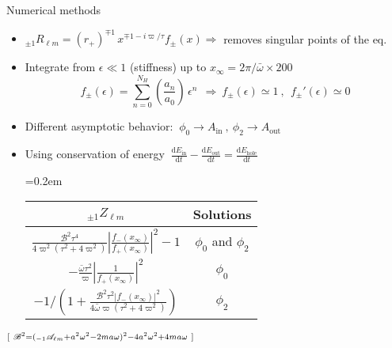 \documentclass[9pt]{beamer}
\newcommand{\dd}{\mathrm{d}}
\newcommand{\uu}[3][]{ {}_{#1} #2_{#3} }
\begin{document}
\begin{frame}{Numerical methods}
	\begin{itemize}
		\setlength\itemsep{1em}
		
		\item $\uu[\pm 1]{R}{\ell m} = (r_+)^{\mp 1} \, x^{ \mp 1 - i \varpi / \tau} f_{\pm}(x) \Rightarrow$ removes singular points of the eq.
		
		\item
		Integrate from $\epsilon\ll 1$ (stiffness) up to $x_\infty = 2\pi/\bar{\omega} \times 200$
		$$ f_{\pm}(\epsilon) = \sum_{n=0}^{N_H} \left(\frac{a_n}{a_0}\right)
		\,\epsilon^n ~~\Rightarrow~ f_{\pm}{}(\epsilon) \simeq 1 ~,~~ f_{\pm}{}'(\epsilon) \simeq 0$$
		
		\item Different asymptotic behavior: $~\phi_0 \to A_\mathrm{in} ~,~ \phi_2 \to A_\mathrm{out}$

		\item
		Using conservation of energy $~\frac{\dd E_\mathrm{in}}{\dd t} - \frac{\dd E_\mathrm{out}}{\dd t} = \frac{\dd E_\mathrm{hole}}{\dd t}$
		\\[0.2cm]
		\begin{center}
			\tabulinesep=0.2em
			\begin{tabu}{@{\hskip 0.25cm}c@{\hskip 0.75cm}c@{\hskip 0.75cm}}
				\hline
				$\uu[\pm 1]{Z}{\ell m}$ & Solutions \\
				\hline\hline
				$\frac{\mathscr{B}^2 \tau^4 }{4 \varpi^2 (\tau^2 + 4 \varpi^2)} \left| \frac{f_{-}(x_\infty)}{f_{+}(x_\infty)} \right|^2 - 1$ & 
				$\phi_0$ and $\phi_2$ \\
				\hline
				$- \frac{\bar{\omega} \tau^2}{\varpi} \left|\frac{1}{f_{+}(x_\infty)}\right|^2$ &
				$\phi_0$ \\
				\hline
				$-1\bigg/\left( 1 + \frac{\mathscr{B}^2 \tau^2 \left|f_{-}(x_\infty)\right|^2}{4 \bar{\omega} \varpi(\tau^2 + 4 \varpi^2)} \right)$ & $\phi_2$ \\
				\hline
			\end{tabu}
		\end{center}
	\end{itemize}
	\vspace*{0.15cm}
	$\hfill\scriptstyle [~ \mathscr{B}^2 = ( \uu[-1]{\mathscr{A}}{\ell m} + a^2\omega^2 - 2 m a \omega )^2 - 4 a^2\omega^2 + 4 m a \omega ~]$
\end{frame}
\end{document}
